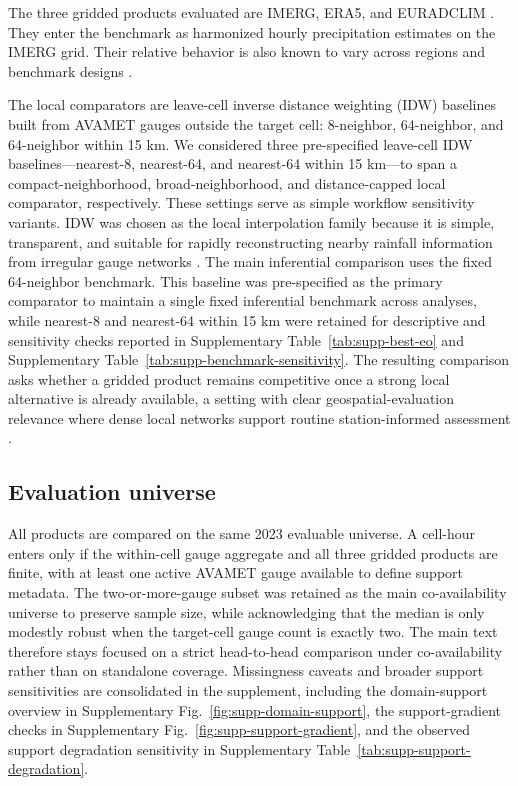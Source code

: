 \documentclass[preprint,12pt]{elsarticle}
\begin{document}
The three gridded products evaluated are IMERG, ERA5, and EURADCLIM \citep{huffman2020imerg,hersbach2020era5,overeem2023euradclim}. They enter the benchmark as harmonized hourly precipitation estimates on the IMERG grid. Their relative behavior is also known to vary across regions and benchmark designs \citep{porcu2014uncertainties,xu2022era5satellite,gomiscebolla2023spain}.

The local comparators are leave-cell inverse distance weighting (IDW) baselines built from AVAMET gauges outside the target cell: 8-neighbor, 64-neighbor, and 64-neighbor within 15 km. We considered three pre-specified leave-cell IDW baselines---nearest-8, nearest-64, and nearest-64 within 15 km---to span a compact-neighborhood, broad-neighborhood, and distance-capped local comparator, respectively. These settings serve as simple workflow sensitivity variants. IDW was chosen as the local interpolation family because it is simple, transparent, and suitable for rapidly reconstructing nearby rainfall information from irregular gauge networks \citep{shepard1968idw,kurtzman2009interpolation}. The main inferential comparison uses the fixed 64-neighbor benchmark. This baseline was pre-specified as the primary comparator to maintain a single fixed inferential benchmark across analyses, while nearest-8 and nearest-64 within 15 km were retained for descriptive and sensitivity checks reported in Supplementary Table~\ref{tab:supp-best-eo} and Supplementary Table~\ref{tab:supp-benchmark-sensitivity}. The resulting comparison asks whether a gridded product remains competitive once a strong local alternative is already available, a setting with clear geospatial-evaluation relevance where dense local networks support routine station-informed assessment \citep{lombardi2024tanaro}.

\subsection{Evaluation universe}

All products are compared on the same 2023 evaluable universe. A cell-hour enters only if the within-cell gauge aggregate and all three gridded products are finite, with at least one active AVAMET gauge available to define support metadata. The two-or-more-gauge subset was retained as the main co-availability universe to preserve sample size, while acknowledging that the median is only modestly robust when the target-cell gauge count is exactly two. The main text therefore stays focused on a strict head-to-head comparison under co-availability rather than on standalone coverage. Missingness caveats and broader support sensitivities are consolidated in the supplement, including the domain-support overview in Supplementary Fig.~\ref{fig:supp-domain-support}, the support-gradient checks in Supplementary Fig.~\ref{fig:supp-support-gradient}, and the observed support degradation sensitivity in Supplementary Table~\ref{tab:supp-support-degradation}.
\end{document}
